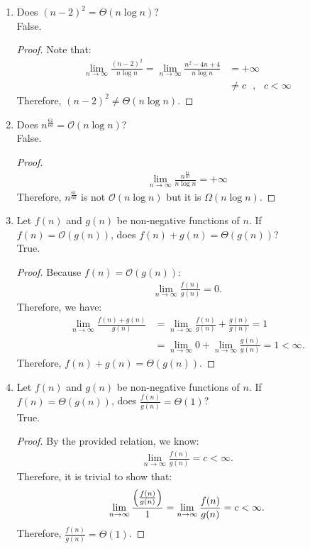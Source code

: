 \documentclass[11pt]{article}
\begin{document}
\begin{enumerate}
\begin{enumerate}
\begin{proof}
\end{proof}
\newpage
\item Does $(n-2)^2 = \Theta(n \log n)$?
\\
False.
\begin{proof}
Note that:
\begin{align*}
\lim_{n \to \infty}\frac{(n-2)^2}{n \log{n}} = \lim_{n \to \infty} \frac{n^2-4n+4}{n \log{n}} &= + \infty 
\\&\neq c \textrm{  },\textrm{  } c < \infty
\end{align*}
Therefore, $(n-2)^2 \neq \Theta(n \log{n})$.
\end{proof}
\item Does $n^{\frac{61}{60}}= \mathcal{O}(n \log{n})$?
\\
False.
\begin{proof}
\begin{align*}
\lim_{n \to \infty} \frac{n^{\frac{61}{60}}}{n \log n}= + \infty
\end{align*}
Therefore, $n^{\frac{61}{60}}$ is not $\mathcal{O}(n \log{n})$ but it is $\Omega(n \log{n})$.
\end{proof}
\item Let $f(n)$ and $g(n)$ be non-negative functions of $n$.  If $f(n)=\mathcal{O}(g(n))$, does $f(n)+g(n)= \Theta(g(n))$?
\\
True.
\begin{proof}
Because $f(n)=\mathcal{O}(g(n))$:
\begin{align*}
\lim_{n \to \infty} \frac{f(n)}{g(n)} = 0.
\end{align*}
Therefore, we have:
\begin{align*}
\lim_{n \to \infty} \frac{f(n)+g(n)}{g(n)} &= \lim_{n \to \infty} \frac{f(n)}{g(n)} + \frac{g(n)}{g(n)}=1
\\&=\lim_{n \to \infty} 0 + \lim_{n \to \infty} \frac{g(n)}{g(n)} = 1 < \infty.
\end{align*}
Therefore, $f(n)+g(n)= \Theta(g(n))$.
\end{proof}
\item Let $f(n)$ and $g(n)$ be non-negative functions of $n$.  If $f(n)=\Theta(g(n))$, does $\frac{f(n)}{g(n)}= \Theta(1)$?
\\
True.
\begin{proof}
By the provided relation, we know:
\begin{align*}
\lim_{n \to \infty}\frac{f(n)}{g(n)}=c< \infty.
\end{align*}
Therefore, it is trivial to show that:
\begin{align*}
\lim_{n \to \infty}\frac{\Bigl(\frac{f(n)}{g(n)}\Bigr)}{1}=\lim_{n \to \infty}\frac{f(n)}{g(n)} = c< \infty.
\end{align*}
Therefore, $\frac{f(n)}{g(n)} = \Theta(1)$.
\end{proof}
\end{enumerate}
\end{enumerate}
\end{document}
